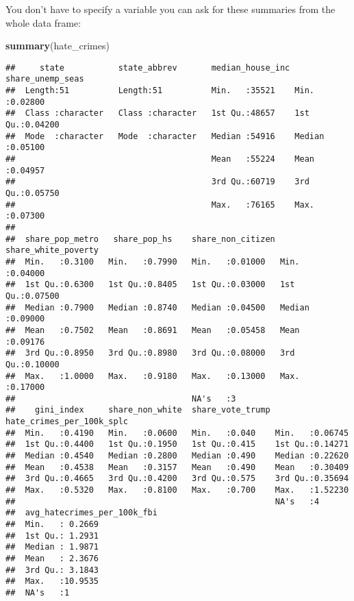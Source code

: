 \documentclass[
]{book}
\newenvironment{Shaded}{\begin{snugshade}}{\end{snugshade}}
\newcommand{\FunctionTok}[1]{\textcolor[rgb]{0.13,0.29,0.53}{\textbf{#1}}}
\newcommand{\NormalTok}[1]{#1}
\begin{document}
You don't have to specify a variable you can ask for these summaries from the whole data frame:

\begin{Shaded}
\begin{Highlighting}[]
\FunctionTok{summary}\NormalTok{(hate\_crimes)}
\end{Highlighting}
\end{Shaded}

\begin{verbatim}
##     state           state_abbrev       median_house_inc share_unemp_seas 
##  Length:51          Length:51          Min.   :35521    Min.   :0.02800  
##  Class :character   Class :character   1st Qu.:48657    1st Qu.:0.04200  
##  Mode  :character   Mode  :character   Median :54916    Median :0.05100  
##                                        Mean   :55224    Mean   :0.04957  
##                                        3rd Qu.:60719    3rd Qu.:0.05750  
##                                        Max.   :76165    Max.   :0.07300  
##                                                                          
##  share_pop_metro   share_pop_hs    share_non_citizen share_white_poverty
##  Min.   :0.3100   Min.   :0.7990   Min.   :0.01000   Min.   :0.04000    
##  1st Qu.:0.6300   1st Qu.:0.8405   1st Qu.:0.03000   1st Qu.:0.07500    
##  Median :0.7900   Median :0.8740   Median :0.04500   Median :0.09000    
##  Mean   :0.7502   Mean   :0.8691   Mean   :0.05458   Mean   :0.09176    
##  3rd Qu.:0.8950   3rd Qu.:0.8980   3rd Qu.:0.08000   3rd Qu.:0.10000    
##  Max.   :1.0000   Max.   :0.9180   Max.   :0.13000   Max.   :0.17000    
##                                    NA's   :3                            
##    gini_index     share_non_white  share_vote_trump hate_crimes_per_100k_splc
##  Min.   :0.4190   Min.   :0.0600   Min.   :0.040    Min.   :0.06745          
##  1st Qu.:0.4400   1st Qu.:0.1950   1st Qu.:0.415    1st Qu.:0.14271          
##  Median :0.4540   Median :0.2800   Median :0.490    Median :0.22620          
##  Mean   :0.4538   Mean   :0.3157   Mean   :0.490    Mean   :0.30409          
##  3rd Qu.:0.4665   3rd Qu.:0.4200   3rd Qu.:0.575    3rd Qu.:0.35694          
##  Max.   :0.5320   Max.   :0.8100   Max.   :0.700    Max.   :1.52230          
##                                                     NA's   :4                
##  avg_hatecrimes_per_100k_fbi
##  Min.   : 0.2669            
##  1st Qu.: 1.2931            
##  Median : 1.9871            
##  Mean   : 2.3676            
##  3rd Qu.: 3.1843            
##  Max.   :10.9535            
##  NA's   :1
\end{verbatim}
\end{document}

